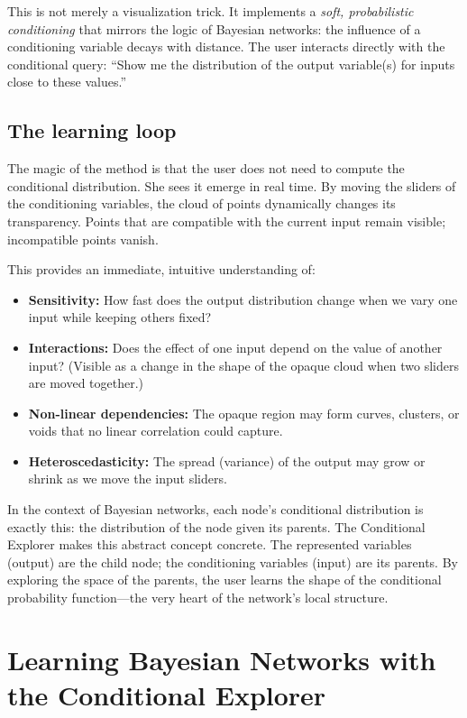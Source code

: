 This is not merely a visualization trick. It implements a \emph{soft, probabilistic conditioning} that mirrors the logic of Bayesian networks: the influence of a conditioning variable decays with distance. The user interacts directly with the conditional query: ``Show me the distribution of the output variable(s) for inputs close to these values.''

\subsection{The learning loop}

The magic of the method is that the user does not need to compute the conditional distribution. She sees it emerge in real time. By moving the sliders of the conditioning variables, the cloud of points dynamically changes its transparency. Points that are compatible with the current input remain visible; incompatible points vanish.

This provides an immediate, intuitive understanding of:

\begin{itemize}
    \item \textbf{Sensitivity:} How fast does the output distribution change when we vary one input while keeping others fixed?
    \item \textbf{Interactions:} Does the effect of one input depend on the value of another input? (Visible as a change in the shape of the opaque cloud when two sliders are moved together.)
    \item \textbf{Non-linear dependencies:} The opaque region may form curves, clusters, or voids that no linear correlation could capture.
    \item \textbf{Heteroscedasticity:} The spread (variance) of the output may grow or shrink as we move the input sliders.
\end{itemize}

In the context of Bayesian networks, each node's conditional distribution is exactly this: the distribution of the node given its parents. The Conditional Explorer makes this abstract concept concrete. The represented variables (output) are the child node; the conditioning variables (input) are its parents. By exploring the space of the parents, the user learns the shape of the conditional probability function—the very heart of the network's local structure.

\section{Learning Bayesian Networks with the Conditional Explorer}

